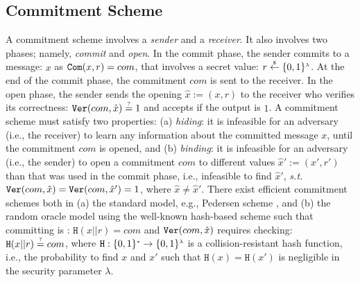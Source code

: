 



\subsection{Commitment Scheme}\label{subsec:commit}


 A commitment scheme involves a  \emph{sender} and a \emph{receiver}. It also  involves  two phases; namely, \emph{commit} and  \emph{open}. In the commit phase, the sender  commits to a message: $x$ as $\mathtt{Com}(x,r)=com$, that involves a secret value: $r\stackrel{\scriptscriptstyle\$}\leftarrow \{0,1\}^{\scriptscriptstyle\lambda}$. At the end of the commit phase,  the commitment ${com}$ is sent to the receiver. In the open phase, the sender sends the opening $\hat{x}:=(x, r)$ to the receiver who verifies its correctness: $\mathtt{Ver}({com},\hat{x})\stackrel{\scriptscriptstyle ?}=1$ and accepts if the output is $1$.  A commitment scheme must satisfy two properties: (a) \textit{hiding}: it is infeasible for an adversary (i.e., the receiver) to learn any information about the committed  message $x$, until the commitment ${com}$ is opened, and (b) \textit{binding}: it is infeasible for an adversary (i.e., the sender) to open a commitment ${com}$ to different values $\hat{x}':=(x',r')$ than that was  used in the commit phase, i.e., infeasible to find  $\hat{x}'$, \textit{s.t.} $\mathtt{Ver}({com},\hat{x})=\mathtt{Ver}({com},\hat{x}')=1$, where $\hat{x}\neq \hat{x}'$.  There exist efficient  commitment schemes both in (a) the standard model, e.g., Pedersen scheme \cite{Pedersen91}, and (b)  the random oracle model using the well-known hash-based scheme such that committing  is : $\mathtt{H}(x||r)={com}$ and $\mathtt{Ver}({com},\hat{x})$ requires checking: $\mathtt{H}(x||r)\stackrel{\scriptscriptstyle ?}={com}$, where $\mathtt{H}:\{0,1\}^{\scriptscriptstyle *}\rightarrow \{0,1\}^{\scriptscriptstyle\lambda}$ is a collision-resistant hash function, i.e., the probability to find $x$ and $x'$ such that $\mathtt{H}(x)=\mathtt{H}(x')$ is negligible in the security parameter $\lambda$.